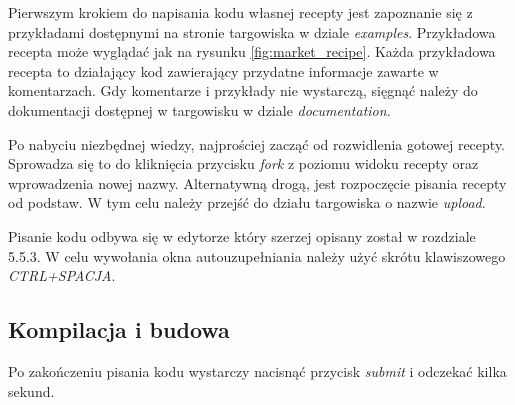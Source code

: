 \documentclass[11pt,a4paper,polish,thesis]{dcsbook}
\begin{document}
Pierwszym krokiem do napisania kodu własnej recepty jest zapoznanie się z przykładami dostępnymi na stronie targowiska w dziale \emph{examples}. Przykładowa recepta
może wyglądać jak na rysunku \ref{fig:market_recipe}. Każda przykładowa recepta to działający kod zawierający przydatne informacje zawarte w komentarzach. Gdy komentarze i przykłady nie wystarczą, sięgnąć należy do dokumentacji dostępnej w targowisku w dziale \emph{documentation}.

Po nabyciu niezbędnej wiedzy, najprościej zacząć od rozwidlenia gotowej recepty. Sprowadza się to do kliknięcia przycisku \emph{fork} z poziomu widoku recepty oraz
wprowadzenia nowej nazwy. Alternatywną drogą, jest rozpoczęcie pisania recepty od podstaw. W tym celu należy przejść do działu targowiska o nazwie \emph{upload}.

Pisanie kodu odbywa się w edytorze który szerzej opisany został w rozdziale 5.5.3. W celu wywołania okna autouzupełniania należy użyć skrótu klawiszowego
\emph{CTRL+SPACJA}.
\subsection{Kompilacja i budowa}
Po zakończeniu pisania kodu wystarczy nacisnąć przycisk \emph{submit} i odczekać kilka sekund.
\end{document}
